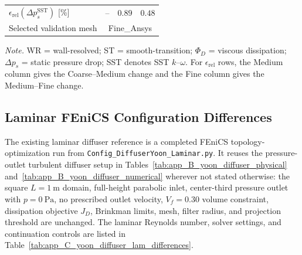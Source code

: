 \begin{table}[htbp]
\begin{tabular*}{\textwidth}{@{\extracolsep{\fill}}lccc@{}}
		$\epsilon_{\mathrm{rel}}(\Delta p_s^{\mathrm{SST}})$ [\%] & -- & $0.89$ & $0.48$ \\
		Selected validation mesh & \multicolumn{3}{c}{Fine\_Ansys} \\
		\hline
	\end{tabular*}
	\vspace{2pt}
	\begin{minipage}{0.98\textwidth}
		\scriptsize \textit{Note.} WR = wall-resolved; ST = smooth-transition; $\Phi_D$ = viscous dissipation; $\Delta p_s$ = static pressure drop; SST denotes SST $k$--$\omega$. For $\epsilon_{\mathrm{rel}}$ rows, the Medium column gives the Coarse--Medium change and the Fine column gives the Medium--Fine change.
	\end{minipage}
\end{table}

\FloatBarrier

\subsection{Laminar FEniCS Configuration Differences}
\label{subsec:app_C_yoon_diffuser_lam_config}
	The existing laminar diffuser reference is a completed FEniCS topology-optimization run from \texttt{Config\_DiffuserYoon\_Laminar.py}. It reuses the pressure-outlet turbulent diffuser setup in Tables~\ref{tab:app_B_yoon_diffuser_physical} and~\ref{tab:app_B_yoon_diffuser_numerical} wherever not stated otherwise: the square $L=1~\mathrm{m}$ domain, full-height parabolic inlet, center-third pressure outlet with $p=0~\mathrm{Pa}$, no prescribed outlet velocity, $V_f=0.30$ volume constraint, dissipation objective $J_D$, Brinkman limits, mesh, filter radius, and projection threshold are unchanged. The laminar Reynolds number, solver settings, and continuation controls are listed in Table~\ref{tab:app_C_yoon_diffuser_lam_differences}.

